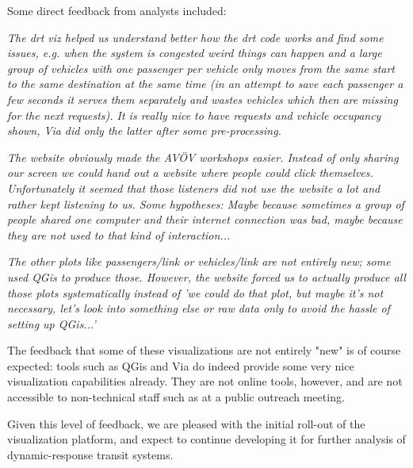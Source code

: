 \documentclass[3p,times,procedia]{elsarticle}
\begin{document}
Some direct feedback from analysts included:

\small{

\begin{displayquote}\emph{
  The drt viz helped us understand better how the drt code works and find some issues, e.g. when the system is congested weird things can happen and a large group of vehicles with one passenger per vehicle only moves from the same start to the same destination at the same time (in an attempt to save each passenger a few seconds it serves them separately and wastes vehicles which then are missing for the next requests). It is really nice to have requests and vehicle occupancy shown, Via did only the latter after some pre-processing.
}\end{displayquote}

\begin{displayquote}\emph{
  The website obviously made the AVÖV workshops easier. Instead of only sharing our screen we could hand out a website where people could click themselves. Unfortunately it seemed that those listeners did not use the website a lot and rather kept listening to us. Some hypotheses: Maybe because sometimes a group of people shared one computer and their internet connection was bad, maybe because they are not used to that kind of interaction...
}\end{displayquote}

\begin{displayquote}\emph{
  The other plots like passengers/link or vehicles/link are not entirely new; some used QGis to produce those. However, the website forced us to actually produce all those plots systematically instead of 'we could do that plot, but maybe it's not necessary, let's look into something else or raw data only to avoid the hassle of setting up QGis...'
}\end{displayquote}

}

The feedback that some of these visualizations are not entirely "new" is of course expected: tools such as QGis and Via do indeed provide some very nice visualization capabilities already. They are not online tools, however, and are not accessible to non-technical staff such as at a public outreach meeting.

Given this level of feedback, we are pleased with the initial roll-out of the visualization platform, and expect to continue developing it for further analysis of dynamic-response transit systems.
\end{document}
